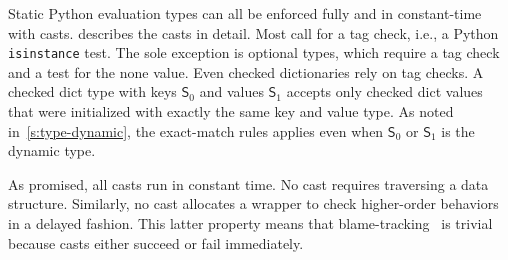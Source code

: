 \documentclass[english,cleveref,submission]{programming}
\newcommand{\SP}{Static Python}
\newcommand{\code}[1]{\texttt{#1}}
\newcommand{\typefont}[1]{\mathsf{#1}}
\newcommand{\spteval}{\typefont{S}}
\begin{document}
\SP{} evaluation types can all be enforced fully and in constant-time
with casts.
 describes the casts in detail.
Most call for a tag check, i.e., a Python \code{isinstance} test.
The sole exception is optional types, which require a tag check and a test for the none value.
Even checked dictionaries rely on tag checks.
A checked dict type with keys $\spteval_0$ and values $\spteval_1$ accepts only
checked dict values that were initialized with exactly the same key and value type.
As noted in~\cref{s:type-dynamic}, the exact-match rules applies even when $\spteval_0$
or $\spteval_1$ is the dynamic type.

As promised, all casts run in constant time.
No cast requires traversing a data structure.
Similarly, no cast allocates a wrapper to check higher-order behaviors in a delayed fashion.
This latter property means that blame-tracking~\cite{ff-icfp-2002} is trivial because
casts either succeed or fail immediately.

\end{document}
